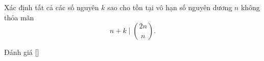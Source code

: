 \ifshowproblem
\begin{problem}\label{problem:CHN-2015-MO-P4}
    Xác định tất cả các số nguyên $k$ sao cho tồn tại vô hạn số nguyên dương $n$ không thỏa mãn
    \[
        n + k \mid \binom{2n}{n}.
    \]
\end{problem}
\fi

\ifshowinfo
Đánh giá [\textbf{}]\footnotemark
{}
\fi